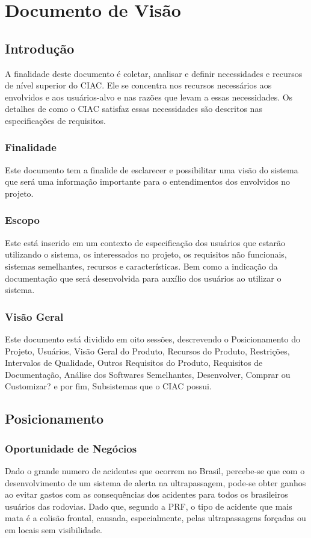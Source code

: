 \chapter[Documento de Visão]{Documento de Visão}

\section{Introdução}
A finalidade deste documento é coletar, analisar e definir necessidades e recursos de nível superior do CIAC. Ele se concentra nos recursos necessários aos envolvidos e aos usuários-alvo e nas razões que levam a essas necessidades. Os detalhes de como o CIAC satisfaz essas necessidades são descritos nas especificações de requisitos.

\subsection{Finalidade}
Este documento tem a finalide de  esclarecer e possibilitar uma visão do sistema que será uma informação importante para o entendimentos dos envolvidos no projeto.
\subsection{Escopo}
Este está inserido em um contexto de especificação dos usuários que estarão utilizando o sistema, os interessados no projeto, os requisitos não funcionais, sistemas semelhantes, recursos e características. Bem como a indicação da documentação que será desenvolvida para auxílio dos usuários ao utilizar o sistema.
\subsection{Visão Geral}
Este documento está dividido em oito sessões, descrevendo o Posicionamento do Projeto, Usuários, Visão Geral do Produto,
Recursos do Produto, Restrições, Intervalos de Qualidade, Outros Requisitos do Produto, Requisitos de Documentação,
 Análise dos Softwares Semelhantes, Desenvolver, Comprar ou Customizar? e por fim, Subsistemas que o CIAC possui.
\section{Posicionamento}

\subsection{Oportunidade de Negócios}
Dado o grande numero de acidentes que ocorrem no Brasil, percebe-se que com o
desenvolvimento de um sistema de alerta na ultrapassagem, pode-se obter
ganhos ao evitar gastos com as consequências dos acidentes para todos os
brasileiros usuários das rodovias. Dado que, segundo a PRF, o tipo de acidente
que mais mata é a colisão frontal, causada, especialmente, pelas ultrapassagens
forçadas ou em locais sem visibilidade\cite{prf}.

